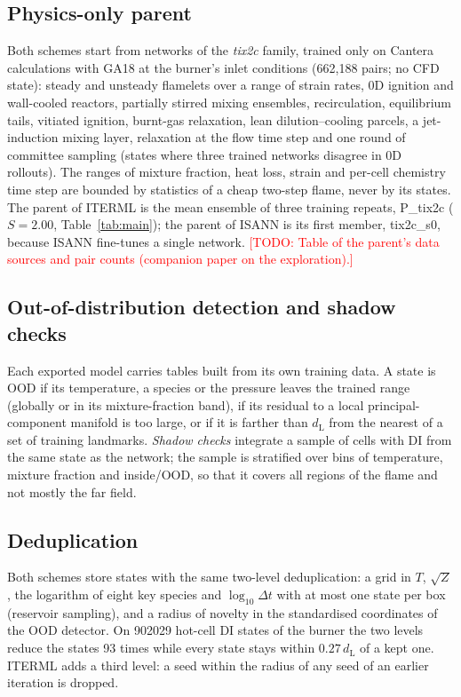 \documentclass[preprint,review,12pt]{elsarticle}
\newcommand{\todo}[1]{\textcolor{red}{[TODO: #1]}}
\begin{document}
\subsection{Physics-only parent}
\label{sec:parent}
Both schemes start from networks of the \emph{tix2c} family, trained only on Cantera~\cite{cantera}
calculations with GA18 at the burner's inlet conditions (662,188 pairs; no CFD state): steady and
unsteady flamelets over a range of strain rates, 0D ignition and wall-cooled reactors, partially stirred
mixing ensembles, recirculation, equilibrium tails, vitiated ignition, burnt-gas relaxation, lean
dilution--cooling parcels, a jet-induction mixing layer, relaxation at the flow time step and one round of
committee sampling (states where three trained networks disagree in 0D rollouts). The ranges of mixture
fraction, heat loss, strain and per-cell chemistry time step are bounded by statistics of a cheap two-step
flame, never by its states. The parent of ITERML is the mean ensemble of three training repeats,
P\_tix2c ($S=2.00$, Table~\ref{tab:main}); the parent of ISANN is its first member, tix2c\_s0, because ISANN
fine-tunes a single network. \todo{Table of the parent's data sources and pair counts (companion paper on
the exploration).}

\subsection{Out-of-distribution detection and shadow checks}
Each exported model carries tables built from its own training data. A state is OOD if its temperature, a
species or the pressure leaves the trained range (globally or in its mixture-fraction band), if its
residual to a local principal-component manifold is too large, or if it is farther than $d_\mathrm{L}$ from
the nearest of a set of training landmarks. \emph{Shadow checks} integrate a sample of cells with DI from
the same state as the network; the sample is stratified over bins of temperature, mixture fraction and
inside/OOD, so that it covers all regions of the flame and not mostly the far field.

\subsection{Deduplication}
Both schemes store states with the same two-level deduplication: a grid in $T$, $\sqrt{Z}$, the logarithm
of eight key species and $\log_{10}\Delta t$ with at most one state per box (reservoir sampling), and a
radius of novelty in the standardised coordinates of the OOD detector. On \num{902029} hot-cell DI states of
the burner the two levels reduce the states 93 times while every state stays within $0.27\,d_\mathrm{L}$ of a
kept one. ITERML adds a third level: a seed within the radius of any seed of an earlier iteration is dropped.
\end{document}
